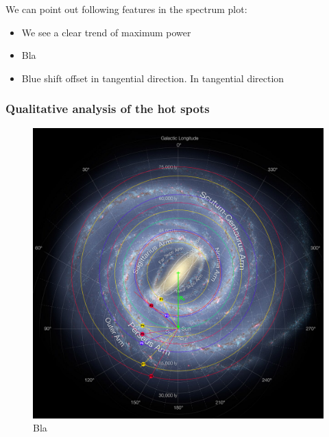 We can point out following features in the spectrum plot:

\begin{itemize}
    \item We see a clear trend of maximum power 
    \item Bla
    \item Blue shift offset in tangential direction. 
    In tangential direction 
\end{itemize}

\subsubsection{Qualitative analysis of the hot spots}


\begin{figure}[H]
    \centering
    \includegraphics[width=\textwidth]{assets/MW_ROI_spots.png}
    \caption{Bla}
    \label{fig:mw_roi_spots}
\end{figure}


